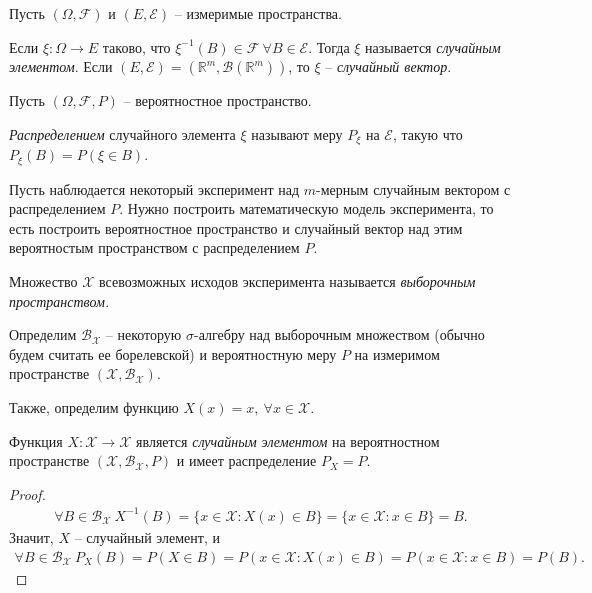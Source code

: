 Пусть $\displaystyle ( \Omega ,\mathcal{F})$ и $\displaystyle ( E,\mathcal{E})$ -- измеримые пространства.
\begin{definition}
	Если $\displaystyle \xi :\Omega \rightarrow E$ таково, что $\displaystyle \xi ^{-1}( B) \in \mathcal{F} \ \forall B\in \mathcal{E}$. Тогда $\displaystyle \xi $ называется \textit{случайным элементом}. Если $\displaystyle ( E,\mathcal{E}) =\left(\mathbb{R}^{m} ,\mathcal{B}\left(\mathbb{R}^{m}\right)\right)$, то $\displaystyle \xi $ -- \textit{случайный вектор}. 
\end{definition}
Пусть $\displaystyle ( \Omega ,\mathcal{F} ,P)$ -- вероятностное пространство.
\begin{definition}
	\textit{Распределением} случайного элемента $\displaystyle \xi $ называют меру $\displaystyle P_{\xi }$ на $\displaystyle \mathcal{E}$, такую что $\displaystyle P_{\xi }( B) =P( \xi \in B)$.
\end{definition}

Пусть наблюдается некоторый эксперимент над $\displaystyle m$-мерным случайным вектором с распределением $\displaystyle P$. Нужно построить математическую модель эксперимента, то есть построить вероятностное пространство и случайный вектор над этим вероятностым пространством с распределением $\displaystyle P$.
\begin{definition}
	Множество $\displaystyle \mathcal{X}$ всевозможных исходов эксперимента называется \textit{выборочным пространством.}
\end{definition}
    Определим $\displaystyle \mathcal{B}_{\mathcal{X}}$ -- некоторую $\displaystyle \sigma $-алгебру над выборочным множеством (обычно будем считать ее борелевской) и вероятностную меру $\displaystyle P$ на измеримом пространстве $\displaystyle (\mathcal{X} ,\mathcal{B}_{\mathcal{X}})$.
    
    Также, определим функцию $\displaystyle X( x) =x,\ \forall x\in \mathcal{X}$.
\begin{proposition}
	Функция $\displaystyle X:\mathcal{X}\rightarrow \mathcal{X}$ является \textit{случайным элементом} на вероятностном пространстве $\displaystyle (\mathcal{X} ,\mathcal{B}_{\mathcal{X}} ,P)$ и имеет распределение $\displaystyle P_{X} =P$.
\end{proposition}
\begin{proof}
    \begin{gather*}
        \forall B\in \mathcal{B}_{\mathcal{X}} \ X^{-1}( B) =\{x\in \mathcal{X} :X( x) \in B\} =\{x\in \mathcal{X} :x\in B\} = B.
    \end{gather*}
    Значит, $X$ -- случайный элемент, и
    \begin{gather*}
        \forall B\in \mathcal{B}_{\mathcal{X}} \ P_{X}( B) =P( X\in B) =P( x\in \mathcal{X} :X( x) \in B) =P( x\in \mathcal{X} :x\in B) =P( B).
    \end{gather*}
\end{proof}


